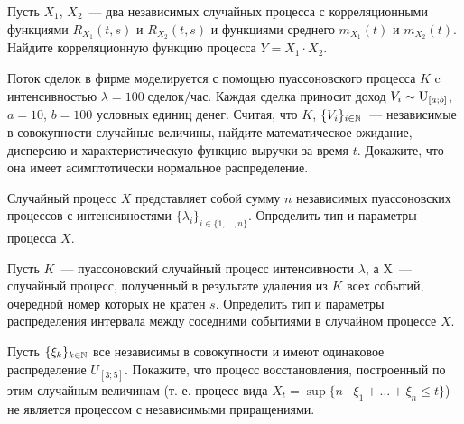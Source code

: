 \documentclass[12pt]{article}
\newcounter{HomeExercise}
\begin{document}
\begin{Exercise}[counter=HomeExercise]
    \noindent
    Пусть $ X_1 $, $ X_2 $~--- два независимых случайных процесса с корреляционными функциями $ R_{X_1}(t, s) $ и $ R_{X_2}(t, s) $
    и функциями среднего $ m_{X_1}(t) $ и $ m_{X_2}(t) $.
    Найдите корреляционную функцию процесса $ Y = X_1 \cdot X_2 $.
\end{Exercise}




\begin{Exercise}[counter=HomeExercise, title={(Задача из канонического задания)}]
    \noindent
    Поток сделок в фирме моделируется с помощью пуассоновского процесса $ K $ c интенсивностью $ \lambda = 100 \; \text{сделок}/\text{час} $.
    Каждая сделка приносит доход $ V_i \sim \textnormal{U}_{[a;b]} $, $ a = 10 $, $ b = 100 $ условных единиц денег.
    Считая, что $ K $, $ \{ V_i \}_{i \in \mathbb{N}} $~--- независимые в совокупности случайные величины,
    найдите математическое ожидание, дисперсию и характеристическую функцию выручки за время $ t $.
    Докажите, что она имеет асимптотически нормальное распределение.
\end{Exercise}


\begin{Exercise}[counter=HomeExercise, title={(Задача из канонического задания)}]
    \noindent
    Случайный процесс $ X $ представляет собой сумму $ n $ независимых пуассоновских процессов
    с интенсивностями $ \{ \lambda_i \}_{i \in \{1, \ldots, n\}} $.
    Определить тип и параметры процесса $ X $.
\end{Exercise}


\begin{Exercise}[counter=HomeExercise, title={(Задача из канонического задания)}]
    \noindent
    Пусть $ K $~--- пуассоновский случайный процесс интенсивности $ \lambda $,
    а X~--- случайный процесс, полученный в результате удаления из $ K $ всех событий,
    очередной номер которых не кратен $ s $.
    Определить тип и параметры распределения интервала между соседними событиями в случайном процессе $ X $.
\end{Exercise}


\begin{Exercise}[counter=HomeExercise]
    \noindent
    Пусть $ \{ \xi_k \}_{k \in \mathbb{N}} $ все независимы в совокупности и имеют одинаковое распределение $ U_{[3;5]} $.
    Покажите, что процесс восстановления, построенный по этим случайным величинам
    (т. е. процесс вида $ X_t = \sup\{n \mid \xi_1 + \ldots + \xi_n \leqslant t\} $)
    не является процессом с независимыми приращениями.
\end{Exercise}
\end{document}

